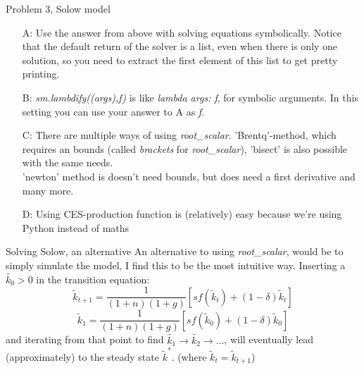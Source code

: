 \documentclass[10pt,danish,t,10pt]{beamer}
\newcommand{\code}[1]{\textit{#1}} %
\begin{document}
\begin{frame}{Problem 3, Solow model}
\begin{itemize}
    \item[A:] Use the answer from above with solving equations symbolically. Notice that the default return of the solver is a list, even when there is only one solution, so you need to extract the first element of this list to get pretty printing.
    \item[B:] \code{sm.lambdify((args),f)} is like \code{lambda args: f}, for symbolic arguments. In this setting you can use your answer to A as \code{f}.
    \item[C:] There are multiple ways of using \code{root\_scalar}. 'Brentq'-method, which requires an bounds (called \code{brackets} for \code{root\_scalar}), 'bisect' is also possible with the same needs. \\
    'newton' method is doesn't need bounds, but does need a first derivative and many more.
    \item[D:] Using CES-production function is (relatively) easy because we're using Python instead of maths
    \end{itemize}
\end{frame}

\begin{frame}{Solving Solow, an alternative }
    An alternative to using \code{root\_scalar}, would be to simply simulate the model, I find this to be the most intuitive way. Inserting a $\tilde{k_{0}}>0$ in the transition equation:
    $$
    \tilde{k}_{t+1}= \frac{1}{(1+n)(1+g)}[sf(\tilde{k}_{t})+(1-\delta)\tilde{k}_{t}]
    $$
    $$
    \tilde{k}_{1}= \frac{1}{(1+n)(1+g)}[sf(\tilde{k}_{0})+(1-\delta)\tilde{k}_{0}]
    $$
    and iterating from that point to find $\tilde{k_{1}} \rightarrow \tilde{k_{2}}\rightarrow \dots$, will eventually lead  (approximately) to the steady state 
    $\tilde{k}^{\ast}$. (where $\tilde{k}_{t}=\tilde{k}_{t+1}$)
\end{frame}
\end{document}
